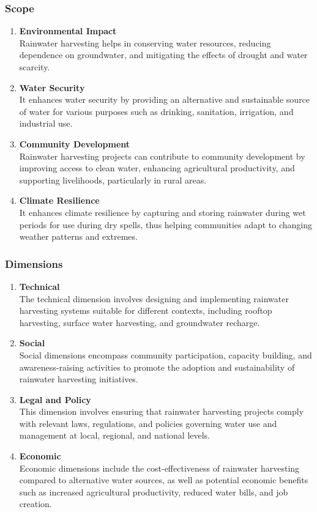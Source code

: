 \documentclass[12pt]{article}
\begin{document}
	\subsubsection{Scope}
	\begin{enumerate}[label=\textbf{\arabic*.}]
		\item \textbf{Environmental Impact} \\
		Rainwater harvesting helps in conserving water resources, reducing dependence on groundwater, and mitigating the effects of drought and water scarcity.
		\item \textbf{Water Security} \\
		It enhances water security by providing an alternative and sustainable source of water for various purposes such as drinking, sanitation, irrigation, and industrial use.
		\item \textbf{Community Development} \\
		Rainwater harvesting projects can contribute to community development by improving access to clean water, enhancing agricultural productivity, and supporting livelihoods, particularly in rural areas.
		\item \textbf{Climate Resilience} \\
		It enhances climate resilience by capturing and storing rainwater during wet periods for use during dry spells, thus helping communities adapt to changing weather patterns and extremes.
	\end{enumerate}  \newpage

	\subsubsection{Dimensions}
	\begin{enumerate}[label=\textbf{\arabic*.}]
		\item \textbf{Technical} \\
		The technical dimension involves designing and implementing rainwater harvesting systems suitable for different contexts, including rooftop harvesting, surface water harvesting, and groundwater recharge.
		\item \textbf{Social} \\
		Social dimensions encompass community participation, capacity building, and awareness-raising activities to promote the adoption and sustainability of rainwater harvesting initiatives.
		\item \textbf{Legal and Policy} \\
		This dimension involves ensuring that rainwater harvesting projects comply with relevant laws, regulations, and policies governing water use and management at local, regional, and national levels.
		\item \textbf{Economic} \\
		Economic dimensions include the cost-effectiveness of rainwater harvesting compared to alternative water sources, as well as potential economic benefits such as increased agricultural productivity, reduced water bills, and job creation.
	\end{enumerate}
\end{document}
